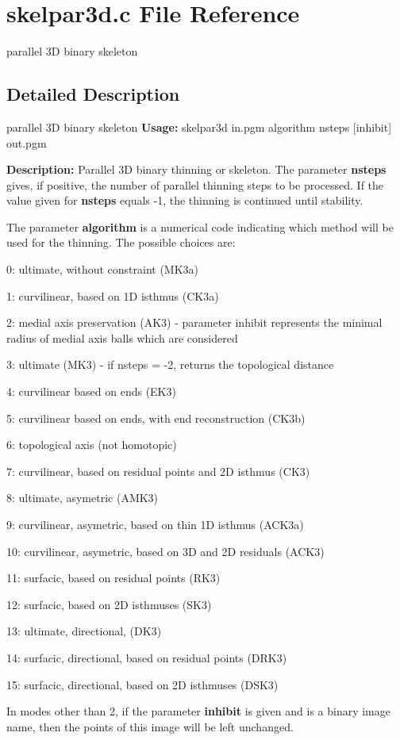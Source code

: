 \section{skelpar3d.c File Reference}
\label{skelpar3d_8c}


parallel 3D binary skeleton  




\subsection{Detailed Description}
parallel 3D binary skeleton {\bfseries Usage:} skelpar3d in.pgm algorithm nsteps [inhibit] out.pgm

{\bfseries Description:} Parallel 3D binary thinning or skeleton. The parameter {\bfseries nsteps} gives, if positive, the number of parallel thinning steps to be processed. If the value given for {\bfseries nsteps} equals -\/1, the thinning is continued until stability.

The parameter {\bfseries algorithm} is a numerical code indicating which method will be used for the thinning. The possible choices are: \begin{DoxyItemize}
\item 0: ultimate, without constraint (MK3a) \item 1: curvilinear, based on 1D isthmus (CK3a) \item 2: medial axis preservation (AK3) -\/ parameter inhibit represents the minimal radius of medial axis balls which are considered \item 3: ultimate (MK3) -\/ if nsteps = -\/2, returns the topological distance \item 4: curvilinear based on ends (EK3) \item 5: curvilinear based on ends, with end reconstruction (CK3b) \item 6: topological axis (not homotopic) \item 7: curvilinear, based on residual points and 2D isthmus (CK3) \item 8: ultimate, asymetric (AMK3) \item 9: curvilinear, asymetric, based on thin 1D isthmus (ACK3a) \item 10: curvilinear, asymetric, based on 3D and 2D residuals (ACK3) \item 11: surfacic, based on residual points (RK3) \item 12: surfacic, based on 2D isthmuses (SK3) \item 13: ultimate, directional, (DK3) \item 14: surfacic, directional, based on residual points (DRK3) \item 15: surfacic, directional, based on 2D isthmuses (DSK3)\end{DoxyItemize}
In modes other than 2, if the parameter {\bfseries inhibit} is given and is a binary image name, then the points of this image will be left unchanged.

